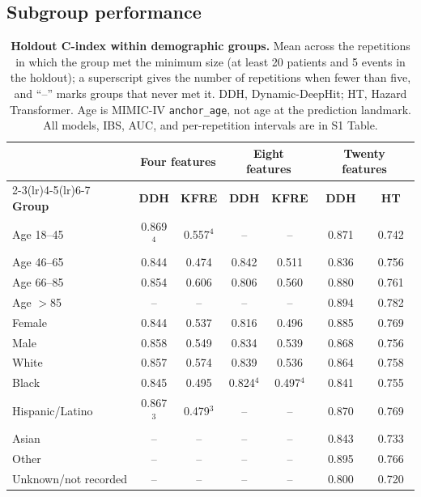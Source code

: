 \documentclass[10pt,letterpaper]{article}
\begin{document}
\subsection*{Subgroup performance}

\begin{table}[h!]
\centering
\footnotesize
\setlength{\tabcolsep}{3pt}
\begin{tabular}{@{}lcccccc@{}}
\toprule
 & \multicolumn{2}{c}{\textbf{Four features}} & \multicolumn{2}{c}{\textbf{Eight features}} & \multicolumn{2}{c}{\textbf{Twenty features}} \\
\cmidrule(lr){2-3}\cmidrule(lr){4-5}\cmidrule(lr){6-7}
\textbf{Group} & \textbf{DDH} & \textbf{KFRE} & \textbf{DDH} & \textbf{KFRE} & \textbf{DDH} & \textbf{HT} \\
\midrule
Age 18--45 & 0.869$^{4}$ & 0.557$^{4}$ & -- & -- & 0.871 & 0.742 \\
Age 46--65 & 0.844 & 0.474 & 0.842 & 0.511 & 0.836 & 0.756 \\
Age 66--85 & 0.854 & 0.606 & 0.806 & 0.560 & 0.880 & 0.761 \\
Age $>$85 & -- & -- & -- & -- & 0.894 & 0.782 \\
Female & 0.844 & 0.537 & 0.816 & 0.496 & 0.885 & 0.769 \\
Male & 0.858 & 0.549 & 0.834 & 0.539 & 0.868 & 0.756 \\
White & 0.857 & 0.574 & 0.839 & 0.536 & 0.864 & 0.758 \\
Black & 0.845 & 0.495 & 0.824$^{4}$ & 0.497$^{4}$ & 0.841 & 0.755 \\
Hispanic/Latino & 0.867$^{3}$ & 0.479$^{3}$ & -- & -- & 0.870 & 0.769 \\
Asian & -- & -- & -- & -- & 0.843 & 0.733 \\
Other & -- & -- & -- & -- & 0.895 & 0.766 \\
Unknown/not recorded & -- & -- & -- & -- & 0.800 & 0.720 \\
\bottomrule
\end{tabular}
\caption{{\bf Holdout C-index within demographic groups.} Mean across the repetitions in which the group met the minimum size (at least 20 patients and 5 events in the holdout); a superscript gives the number of repetitions when fewer than five, and ``--'' marks groups that never met it. DDH, Dynamic-DeepHit; HT, Hazard Transformer. Age is MIMIC-IV \texttt{anchor\_age}, not age at the prediction landmark. All models, IBS, AUC, and per-repetition intervals are in S1 Table.}
\label{tab:subgroup}
\end{table}
\end{document}
